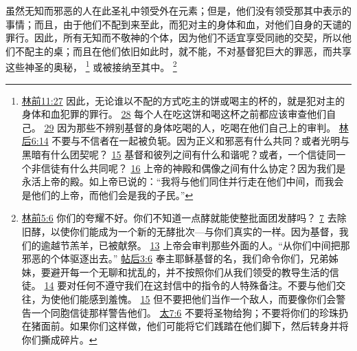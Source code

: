 \documentclass[12pt, a4paper, oneside]{ctexart}
\newcounter{parnum}[section]
\newcommand{\N}{%
   \noindent\refstepcounter{parnum}%
    \makebox[\parindent][l]{\textbf{\arabic{parnum}.}}}
\begin{document}
\N 虽然无知而邪恶的人在此圣礼中领受外在元素；但是，他们没有领受那其中表示的事情；而且，由于他们不配到来至此，而犯对主的身体和血，对他们自身的天谴的罪行。因此，所有无知而不敬神的个体，因为他们不适宜享受同祂的交契，所以他们不配主的桌；而且在他们依旧如此时，就不能，不对基督犯巨大的罪恶，而共享这些神圣的奥秘，
	\footnote {
		\href{https://biblehub.com/1_corinthians/11-27.htm}{林前11:27} 因此，无论谁以不配的方式吃主的饼或喝主的杯的，就是犯对主的身体和血犯罪的罪行。
		\href{https://biblehub.com/1_corinthians/11-28.htm}{28} 每个人在吃这饼和喝这杯之前都应该审查他们自己。
		\href{https://biblehub.com/1_corinthians/11-29.htm}{29} 因为那些不辨别基督的身体吃喝的人，吃喝在他们自己上的审判。
		\href{https://biblehub.com/2_corinthians/6-14.htm}{林后6:14} 不要与不信者在一起被负轭。因为正义和邪恶有什么共同？或者光明与黑暗有什么团契呢？
		\href{https://biblehub.com/2_corinthians/6-15.htm}{15} 基督和彼列之间有什么和谐呢？或者，一个信徒同一个非信徒有什么共同呢？
		\href{https://biblehub.com/2_corinthians/6-16.htm}{16} 上帝的神殿和偶像之间有什么协定？因为我们是永活上帝的殿。如上帝已说的：“我将与他们同住并行走在他们中间，而我会是他们的上帝，而他们会是我的子民。”
	}
	或被接纳至其中。
	\footnote {
		\href{https://biblehub.com/1_corinthians/5-6.htm}{林前5:6} 你们的夸耀不好。你们不知道一点酵就能使整批面团发酵吗？
		\href{https://biblehub.com/1_corinthians/5-7.htm}{7} 去除旧酵，以使你们能成为一个新的无酵批次---与你们真实的一样。因为基督，我们的逾越节羔羊，已被献祭。
		\href{https://biblehub.com/1_corinthians/5-13.htm}{13} 上帝会审判那些外面的人。“从你们中间把那邪恶的个体驱逐出去。”
		\href{https://biblehub.com/2_thessalonians/3-6.htm}{帖后3:6} 奉主耶稣基督的名，我们命令你们，兄弟姊妹，要避开每一个无聊和扰乱的，并不按照你们从我们领受的教导生活的信徒。
		\href{https://biblehub.com/2_thessalonians/3-14.htm}{14} 要对任何不遵守我们在这封信中的指令的人特殊备注。不要与他们交往，为使他们能感到羞愧。
		\href{https://biblehub.com/2_thessalonians/3-15.htm}{15} 但不要把他们当作一个敌人，而要像你们会警告一个同胞信徒那样警告他们。
		\href{https://biblehub.com/matthew/7-6.htm}{太7:6} 不要将圣物给狗；不要将你们的珍珠扔在猪面前。如果你们这样做，他们可能将它们践踏在他们脚下，然后转身并将你们撕成碎片。
	}
\end{document}
